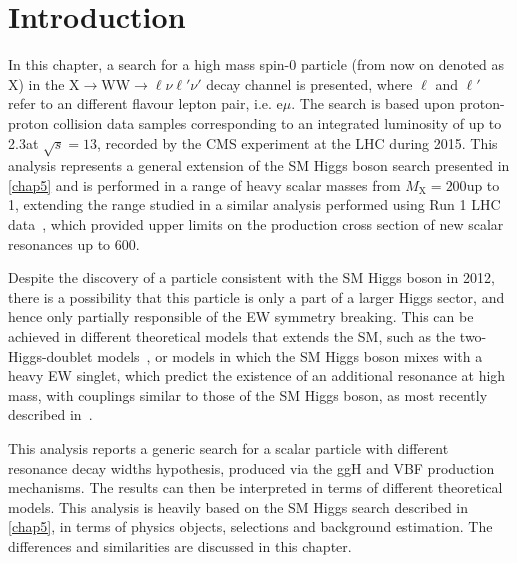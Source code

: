 \section{Introduction}\label{chap6:introduction}

In this chapter, a search for a high mass spin-0 particle (from now on denoted as X) in the X$\rightarrow$WW$\rightarrow \ell\nu\ell'\nu'$ decay channel is presented, where $\ell$ and $\ell'$ refer to an different flavour lepton pair, i.e. e$\mu$. 
The search is based upon proton-proton collision data samples corresponding to an integrated luminosity
of up to 2.3\ifb  at $\sqrt{s} = 13$\TeV, recorded by the CMS experiment at the LHC during 2015. This analysis represents a general extension of the SM Higgs boson search presented in \ref{chap5} and is performed in a range of heavy scalar masses from $M_\mathrm{X} = 200$\GeV up to 1\TeV, extending the range studied in a similar analysis performed using Run 1 LHC data~\cite{Khachatryan:2015cwa}, which provided upper limits on the production cross section of new scalar resonances up to 600\GeV.

Despite the discovery of a particle consistent with the SM Higgs boson in 2012, there is a possibility that this particle is only a part of a larger Higgs sector, and hence only partially responsible of the EW symmetry breaking. This can be achieved in different theoretical models that extends the SM, such as the two-Higgs-doublet models~\cite{Branco:2011iw,craig,Haber:2015},
or models in which the SM Higgs boson mixes with a heavy EW singlet, which predict the existence
of an additional resonance at high mass, with couplings similar to those of the SM Higgs boson, as most recently described in~\cite{Chpoi:2013wga,Robens:2015gla}.

This analysis reports a generic search for a scalar particle with different resonance decay widths hypothesis, produced via the ggH and VBF production mechanisms. The results can then be interpreted in terms of different theoretical models. This analysis is heavily based on the SM Higgs search described in \ref{chap5}, in terms of physics objects, selections and background estimation. The differences and similarities are discussed in this chapter.
